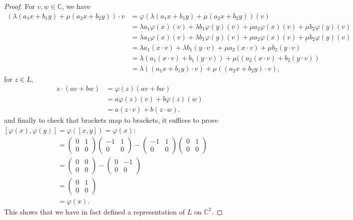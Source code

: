 \documentclass[12pt]{article}
\theoremstyle{definition}
\begin{document}
\begin{proof}
    For $v, w \in \mathbb{C}$, we have \begin{align*}
        (\lambda(a_1x + b_1y) + \mu(a_2x + b_2y))\cdot v & =  \varphi(\lambda(a_1x + b_1y) + \mu(a_2x + b_2y))(v) \\
        & =  \lambda a_1\varphi(x)(v) + \lambda b_1\varphi(y)(v) + \mu a_2\varphi(x)(v) + \mu b_2\varphi(y)(v)  \\
        & =  \lambda a_1\varphi(x)(v) + \lambda b_1\varphi(y)(v) + \mu a_2\varphi(x)(v) + \mu b_2\varphi(y)(v)  \\
        & = \lambda a_1(x \cdot v) + \lambda b_1(y\cdot v) + \mu a_2(x \cdot v) + \mu b_2(y \cdot v) \\
        & = \lambda(a_1(x \cdot v) + b_1(y\cdot v)) + \mu((a_2(x \cdot v) + b_2(y \cdot v)) \\
        & = \lambda((a_1x + b_1y)\cdot v) + \mu((a_2x + b_2y)\cdot v),
    \end{align*}
    for $z \in L$, \begin{align*}
        z \cdot (av + bw) & = \varphi(z)(av + bw) \\
        & = a\varphi(z)(v) + b\varphi(z)(w) \\
        & = a(z \cdot v) + b(z \cdot w),
    \end{align*}
    and finally to check that brackets map to brackets, it suffices to prove $[\varphi(x), \varphi(y)] = \varphi([x, y]) = \varphi(x)$: \begin{align*}
      [\varphi(x), \varphi(y)] & = \begin{pmatrix}0 & 1 \\ 0 & 0\end{pmatrix}\begin{pmatrix}-1 & 1 \\ 0 & 0\end{pmatrix} - \begin{pmatrix}-1 & 1 \\ 0 & 0\end{pmatrix}\begin{pmatrix}0 & 1 \\ 0 & 0\end{pmatrix} \\
        & = \begin{pmatrix}0 & 0 \\ 0 & 0\end{pmatrix} - \begin{pmatrix}0 & -1 \\ 0 & 0\end{pmatrix} \\
          & = \begin{pmatrix}0 & 1 \\ 0 & 0\end{pmatrix} \\
            & = \varphi(x).
    \end{align*}
    This shows that we have in fact defined a representation of $L$ on $\mathbb{C}^2$.


\end{proof}
\end{document}
